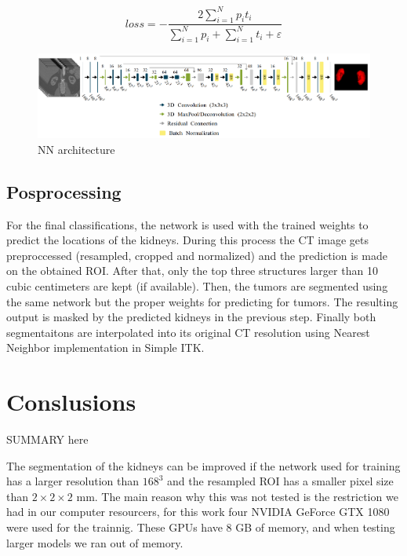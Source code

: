 \documentclass{article}
\begin{document}
\begin{equation}
    loss = - \frac{2 \sum_{i=1}^{N}p_it_i}{\sum_{i=1}^{N}p_i + \sum_{i=1}^{N}t_i + \varepsilon}
    \label{eq:dsc}
\end{equation}

\begin{figure}[h]
    \centering
    \includegraphics[totalheight=.18\textheight]{imgs/nn.png}
    \caption{NN architecture }
    \label{fig:arc}
\end{figure}


\subsection{Posprocessing}
\label{sec:post}
For the final classifications, the network is used with the trained weights to predict the locations of the kidneys. During this process the CT image gets preproccessed (resampled, cropped and normalized) and the prediction is made on the obtained ROI.
After that, only the top three structures  larger than 10 cubic centimeters are kept (if available). Then, the tumors
are segmented using the same network but the proper weights for predicting for tumors. The resulting output is masked
by the predicted kidneys in the previous step. Finally both segmentaitons are interpolated into its original CT resolution using Nearest Neighbor implementation in Simple ITK. 

\section{Conslusions}
\label{sec:conlusions}
SUMMARY here

The segmentation of the kidneys can be improved if the network used for training has a larger resolution than $168^3$
and the resampled ROI has a smaller pixel size than $2 \times 2 \times 2$ mm. The main reason why this was not tested
is the restriction we had in our computer resourcers, for this work four NVIDIA GeForce GTX 1080 were used for the trainnig.
These GPUs have 8 GB of memory, and when testing larger models we ran out of memory. 
\end{document}
